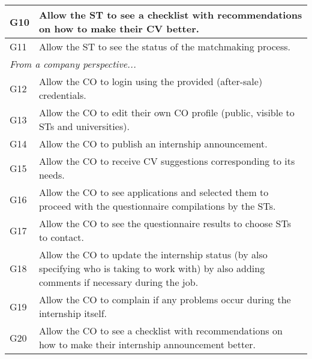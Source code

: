 \begin{table}[H]
\begin{longtable}{|l|p{}|}
        \hline
        G10           & Allow the ST to see a checklist with recommendations on how to make their CV better.                                                              \\
        \hline
        G11           & Allow the ST to see the status of the matchmaking process.                                                                                        \\
        \hline \hline
        \multicolumn{2}{|l|}{\textit{From a company perspective...}}                                                                                                      \\
        \hline
        G12           & Allow the CO to login using the provided (after-sale) credentials.                                                                                \\
        \hline
        G13           & Allow the CO to edit their own CO profile (public, visible to STs and universities).                                                              \\
        \hline
        G14           & Allow the CO to publish an internship announcement.                                                                                               \\
        \hline
        G15           & Allow the CO to receive CV suggestions corresponding to its needs.                                                                                \\
        \hline
        G16           & Allow the CO to see applications and selected them to proceed with the questionnaire compilations by the STs.                                     \\
        \hline
        G17           & Allow the CO to see the questionnaire results to choose STs to contact.                                                                           \\
        \hline
        G18           & Allow the CO to update the internship status (by also specifying who is taking to work with) by also adding comments if necessary during the job. \\
        \hline
        G19           & Allow the CO to complain if any problems occur during the internship itself.                                                                      \\
        \hline
        G20           & Allow the CO to see a checklist with recommendations on how to make their internship announcement better.                                         \\

\end{longtable}
\end{table}
